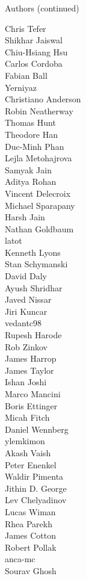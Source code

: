 \begin{frame}{Authors (continued)}
\begin{multicols}{5}
Chris Tefer\\
Shikhar Jaiswal\\
Chiu-Hsiang Hsu\\
Carlos Cordoba\\
Fabian Ball\\
Yerniyaz\\
Christiano Anderson\\
Robin Neatherway\\
Thomas Hunt\\
Theodore Han\\
Duc-Minh Phan\\
Lejla Metohajrova\\
Samyak Jain\\
Aditya Rohan\\
Vincent Delecroix\\
Michael Sparapany\\
Harsh Jain\\
Nathan Goldbaum\\
latot\\
Kenneth Lyons\\
Stan Schymanski\\
David Daly\\
Ayush Shridhar\\
Javed Nissar\\
Jiri Kuncar\\
vedantc98\\
Rupesh Harode\\
Rob Zinkov\\
James Harrop\\
James Taylor\\
Ishan Joshi\\
Marco Mancini\\
Boris Ettinger\\
Micah Fitch\\
Daniel Wennberg\\
ylemkimon\\
Akash Vaish\\
Peter Enenkel\\
Waldir Pimenta\\
Jithin D. George\\
Lev Chelyadinov\\
Lucas Wiman\\
Rhea Parekh\\
James Cotton\\
Robert Pollak\\
anca-mc\\
Sourav Ghosh\\

\end{multicols}
\end{frame}
